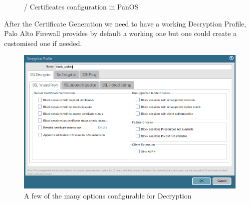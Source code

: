 \begin{figure}[!hb]
\centering
 \hspace{0.5cm}
 \caption{/ Certificates configuration in PanOS}\label{Certificates}
\end{figure}

\newpage

After the Certificate Generation we need to have a working Decryption Profile, Palo Alto Firewall provides by default a working one but one could create a customised one if needed.

\begin{figure}[!hb]
    \centering
     \includegraphics[width=13cm]{img/decryption_options.png}
    	\caption{A few of the many options configurable for Decryption}\label{Decryption Options}
\end{figure}

